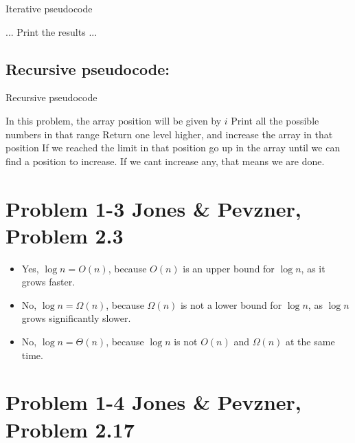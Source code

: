 \documentclass{article}
\begin{document}
\begin{algorithm}[H]
\caption{Iterative pseudocode}
\begin{algorithmic}[1]
  \State ...
   \State Print the results
  \EndFor
  \State ...
 \EndFor
\EndFor
\end{algorithmic}
\end{algorithm}

\subsection*{Recursive pseudocode:}

\begin{algorithm}[H]
\caption{Recursive pseudocode}
\begin{algorithmic}[1]
\State In this problem, the array position will be given by $i$
 \EndIf
   \State Print all the possible numbers in that range
  \EndFor
  \State Return one level higher, and increase the array in that position
  \State If we reached the limit in that position go up in the array until we can find
  \State a position to increase. If we cant increase any, that means we are done.
 \EndIf
\EndFucntion
\end{algorithmic}
\end{algorithm}

\section*{Problem 1-3 Jones \& Pevzner, Problem 2.3}

\begin{itemize}

\item Yes, $\log n = O(n)$, because $O(n)$ is an upper bound for $\log n$, as it grows faster.

\item No, $\log n = \Omega(n)$, because $\Omega(n)$ is not a lower bound for $\log n$, as $\log n$ grows significantly slower.

\item No, $\log n = \Theta(n)$, because $\log n$ is not $O(n)$ and $\Omega(n)$ at the same time.

\end{itemize}

\section*{Problem 1-4 Jones \& Pevzner, Problem 2.17}
\end{document}
